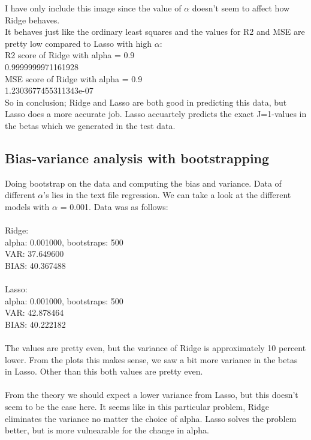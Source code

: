\documentclass[a4paper,norsk]{article}
\begin{document}
I have only include this image since the value of $\alpha$ doesn't seem to affect how Ridge behaves.\\
It behaves just like the ordinary least squares and the values for R2 and MSE are pretty low compared to Lasso with high $\alpha$:\\
R2 score of Ridge with alpha = 0.9\\
0.9999999971161928\\
MSE score of Ridge with alpha = 0.9\\
1.2303677455311343e-07\\
So in conclusion; Ridge and Lasso are both good in predicting this data, but Lasso does a more accurate job. Lasso accuartely predicts the exact J=1-values in the betas which we generated in the test data.


\subsection{Bias-variance analysis with bootstrapping}
Doing bootstrap on the data and computing the bias and variance. Data of different $\alpha$'s lies in the text file regression. We can take a look at the different models with $\alpha$ = 0.001. Data was as follows:\\
\\
Ridge:\\
alpha: 0.001000, bootstraps: 500\\
VAR: 37.649600\\
BIAS: 40.367488\\
\\
Lasso:\\
alpha: 0.001000, bootstraps: 500\\
VAR: 42.878464\\
BIAS: 40.222182\\
\\
The values are pretty even, but the variance of Ridge is approximately 10 percent lower. From the plots this makes sense, we saw a bit more variance in the betas in Lasso. Other than this both values are pretty even.\\
\\
From the theory we should expect a lower variance from Lasso, but this doesn't seem to be the case here. It seems like in this particular problem, Ridge eliminates the variance no matter the choice of alpha. Lasso solves the problem better, but is more vulnearable for the change in alpha.
\\
\end{document}
